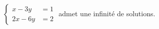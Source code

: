 $\begin{cases}x-3y &= 1 \\ 2x-6y &= 2\end{cases}$ admet une infinité de solutions.

\begin{reponses}
\end{reponses}

